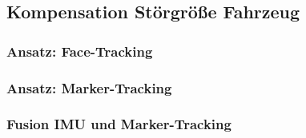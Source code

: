 
\subsection{Kompensation Störgröße Fahrzeug}



\subsubsection{Ansatz: Face-Tracking}



\subsubsection{Ansatz: Marker-Tracking}



\subsubsection{Fusion IMU und Marker-Tracking}
